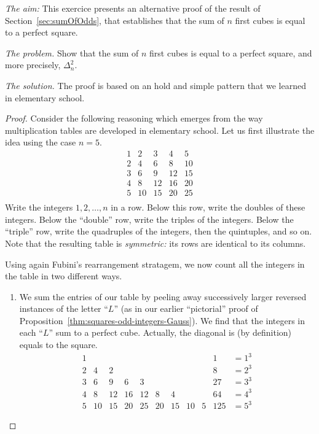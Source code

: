 \noindent \textit{The aim:}
This exercice presents an alternative proof of the result of Section~\ref{sec:sumOfOdds},
that establishes that the sum of $n$ first cubes is equal to a perfect square.
\medskip

\noindent \textit{The problem.}
Show that the sum of $n$ first cubes is equal to a perfect square, and more precisely, $\Delta_n^2$.
\medskip

\noindent \textit{The solution.}
The proof is based on an hold and simple pattern that we learned in elementary school.
\medskip

\begin{proof}
%
Consider the following reasoning which emerges from the way
multiplication tables are developed in elementary school.  
Let us first illustrate the idea using the case $n=5$.
\begin{equation}
\label{eq:Fubini-table}
\begin{array}{rrrrr}
1  &  2 &  3 &  4 &  5 \\
2  &  4 &  6 &  8 & 10 \\
3  &  6 &  9 & 12 & 15 \\
4  &  8 & 12 & 16 & 20 \\
5  & 10 & 15 & 20 & 25 \\
\end{array}
\end{equation}
Write the integers $1, 2, \ldots, n$ in a row.  Below this row, write
the doubles of these integers.  Below the ``double'' row, write the
triples of the integers.  Below the ``triple'' row, write the
quadruples of the integers, then the quintuples, and so on.  Note that
the resulting table is {\em symmetric:} its rows are identical to its
columns.
\medskip

Using again Fubini's rearrangement stratagem, we now count all the integers in
the table in two different ways.
\begin{enumerate}
\item
We sum the entries of our table by peeling away successively larger
reversed instances of the letter ``$L$'' (as in our earlier
``pictorial'' proof of
Proposition~\ref{thm:squares-odd-integers-Gauss}).  We find that the
integers in each ``$L$'' sum to a perfect cube.
Actually, the diagonal is (by definition) equals to the square.
\[
\begin{array}{rrrrrrrrr|rrc}
1  &    &    &    &    &   &     &    &   & 1   & = 1^3 \\
2  &  4 &  2 &    &    &   &     &    &   & 8   & = 2^3 \\
3  &  6 &  9 &  6 &  3 &   &     &    &   & 27  & = 3^3 \\
4  &  8 & 12 & 16 & 12 &  8 &  4 &    &   & 64  & = 4^3 \\
5  & 10 & 15 & 20 & 25 & 20 & 15 & 10 & 5 & 125 & = 5^3
\end{array}
\]


\end{enumerate}
\end{proof}
